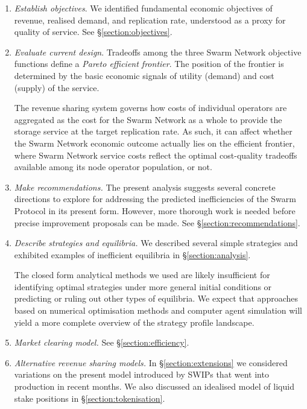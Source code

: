 \begin{enumerate}
  \item 
    \emph{Establish objectives}. 
    We identified fundamental economic objectives of revenue, realised demand, and replication rate, understood as a proxy for quality of service. 
    See \S\ref{section:objectives}.

  \item 
    \emph{Evaluate current design}. 
    Tradeoffs among the three Swarm Network objective functions define a \emph{Pareto efficient frontier}.
    The position of the frontier is determined by the basic economic signals of utility (demand) and cost (supply) of the service.
    
    The revenue sharing system governs how costs of individual operators are aggregated as the cost for the Swarm Network as a whole to provide the storage service at the target replication rate.
    As such, it can affect whether the Swarm Network economic outcome actually lies on the efficient frontier, where Swarm Network service costs reflect the optimal cost-quality tradeoffs available among its node operator population, or not.

  \item 
    \emph{Make recommendations.} 
    The present analysis suggests several concrete directions to explore for addressing the predicted inefficiencies of the Swarm Protocol in its present form.
    However, more thorough work is needed before precise improvement proposals can be made.
    See \S\ref{section:recommendations}.

  \item 
    \emph{Describe strategies and equilibria.} 
    We described several simple strategies and exhibited examples of inefficient equilibria in \S\ref{section:analysis}.
    
    The closed form analytical methods we used are likely insufficient for identifying optimal strategies under more general initial conditions or predicting or ruling out other types of equilibria.
    We expect that approaches based on numerical optimisation methods and computer agent simulation will yield a more complete overview of the strategy profile landscape.
  
  \item 
    \emph{Market clearing model.} See \S\ref{section:efficiency}.
    
  \item 
    \emph{Alternative revenue sharing models.} 
    In \S\ref{section:extensions} we considered variations on the present model introduced by SWIPs that went into production in recent months.
    We also discussed an idealised model of liquid stake positions in \S\ref{section:tokenisation}.

\end{enumerate}



